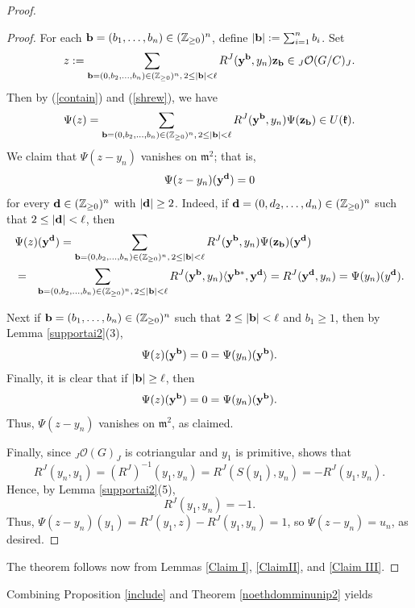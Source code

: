 \documentclass{amsart}
\numberwithin{equation}{section}
\theoremstyle{definition}
\begin{document}
\begin{proof}
\begin{proof}
For each ${\bf b}=(b_1,\ldots,b_n) \in (\mathbb{Z}_{\geq 0})^n$, define $|{\bf b}|:=\sum_{i=1}^n b_i$. Set
$$z:=\sum_{{\bf b}=(0,b_2,\dots,b_n) \in (\mathbb{Z}_{\geq 0})^n,\,2\le |{\bf b}|<{\ell}}R^J({\bf y}^{{\bf b}},y_n){\bf z}_{{\bf b}}\in {}_J\mathcal{O}(G/C )_J.$$ 
Then by (\ref{contain}) and (\ref{shrew}), we have
$$\Psi(z)=\sum_{{\bf b}=(0,b_2,\dots,b_n) \in (\mathbb{Z}_{\geq 0})^n,\,2\le |{\bf b}|<{\ell}}R^J({\bf y}^{{\bf b}},y_n)\Psi({\bf z}_{{\bf b}})\in U(\mathfrak{k}).$$
We claim that $\Psi(z-y_n)$ vanishes on $\mathfrak{m}^2$; that is,  
$$\Psi(z-y_n)({\bf y}^{{\bf d}})=0$$ 
for every ${\bf d} \in (\mathbb{Z}_{\geq 0})^n$ with $|{\bf d}|\geq 2$. 
Indeed, if ${\bf d}=(0,d_2,\dots,d_n) \in (\mathbb{Z}_{\geq 0})^n$ such that $2\le |{\bf d}|<\ell$, then 
\begin{eqnarray*}
\lefteqn{\Psi(z)({\bf y}^{{\bf d}})=\sum_{{\bf b}=(0,b_2,\dots,b_n) \in (\mathbb{Z}_{\geq 0})^n,\,2\le |{\bf b}|<{\ell}}R^J({\bf y}^{{\bf b}},y_n)\Psi({\bf z}_{{\bf b}})({\bf y}^{{\bf d}})}\\
& = & \sum_{{\bf b}=(0,b_2,\dots,b_n) \in (\mathbb{Z}_{\geq 0})^n,\,2\le |{\bf b}|<{\ell}}R^J({\bf y}^{{\bf b}},y_n)\langle {\bf y}^{{\bf b*}},{\bf y}^{{\bf d}}\rangle
=R^J({\bf y}^{{\bf d}},y_n)=\Psi(y_n)(y^{{\bf d}}).
\end{eqnarray*}

Next if ${\bf b} =(b_1, \ldots , b_n) \in (\mathbb{Z}_{\geq 0})^n$ such that $2\le |{\bf b}|<\ell$ and $b_1\ge 1$, then by Lemma \ref{supportai2}(3), 
$$\Psi(z)({\bf y}^{{\bf b}})=0=\Psi(y_n)({\bf y}^{{\bf b}}).$$
Finally, it is clear that if $|{\bf b}|\geq \ell$, then  
$$\Psi(z)({\bf y}^{{\bf b}})=0=\Psi(y_n)({\bf y}^{{\bf b}}).$$
Thus, $\Psi(z-y_n)$ vanishes on $\mathfrak{m}^2$, as claimed. 

Finally, since ${}_J\mathcal{O}(G)_J$ is cotriangular and $y_1$ is primitive, \cite[Lemma 2.2.2]{Ma1} shows that
$$ R^J(y_n,y_1)=(R^J)^{-1}(y_1,y_n)= R^J(S(y_1), y_n)= -R^J(y_1,y_n).$$
Hence, by Lemma \ref{supportai2}(5),
\begin{equation}\label{value} R^J(y_1, y_n)= -1.
\end{equation}
Thus, $\Psi(z-y_n)(y_1)=R^J(y_1, z)-R^J(y_1, y_n)=1$, so $\Psi(z-y_n)=u_n$, as desired.
\end{proof}
\medskip

The theorem follows now from Lemmas \ref{Claim I}, \ref{ClaimII}, and \ref{Claim III}.
\end{proof}

Combining Proposition \ref{include} and Theorem \ref{noethdomminunip2} yields
 
\end{document}
